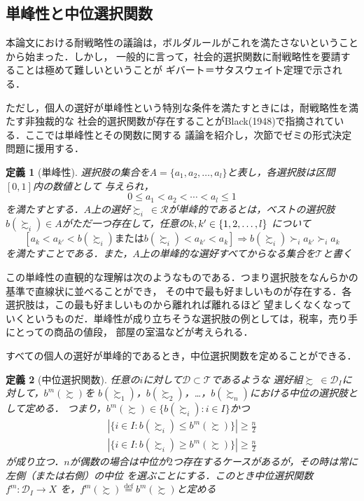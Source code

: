 \documentclass[dvipdfmx]{jsarticle}
\newtheorem*{DEfinition}{定義}
\begin{document}
\subsection{単峰性と中位選択関数}
本論文における耐戦略性の議論は，ボルダルールがこれを満たさないということから始まった．しかし，
一般的に言って，社会的選択関数に耐戦略性を要請することは極めて難しいということが
ギバート＝サタスウェイト定理で示される．

ただし，個人の選好が単峰性という特別な条件を満たすときには，耐戦略性を満たす非独裁的な
社会的選択関数が存在することがBlack(1948)で指摘されている．ここでは単峰性とその関数に関する
議論を紹介し，次節でゼミの形式決定問題に援用する．

\begin{DEfinition}[単峰性]
  選択肢の集合を$A = \{a_1, a_2, \ldots, a_{l}\}$と表し，各選択肢は区間$[0,1]$内の数値として
  与えられ，
  \[
    0 \leq a_1 < a_2 < \cdots < a_{l} \leq 1
  \]
  を満たすとする．$A$上の選好$\succsim_i \ \in \mathcal{R}$が単峰的であるとは，ベストの選択肢
  $b(\succsim_i) \in A$がただ一つ存在して，任意の$k, k' \in \{ 1, 2, \ldots, \mathnormal{l} \}$
  について
  \[
    [a_k < a_{k'} < b(\succsim_i) \text{または} b(\succsim_i) < a_{k'} < a_k]
    \Rightarrow b(\succsim_i) \succ_i a_{k'} \succ_i a_{k}
  \]
  を満たすことである．また，$A$上の単峰的な選好すべてからなる集合を$\mathcal{T}$と書く
\end{DEfinition}

この単峰性の直観的な理解は次のようなものである．つまり選択肢をなんらかの基準で直線状に並べることができ，
その中で最も好ましいものが存在する．各選択肢は，この最も好ましいものから離れれば離れるほど
望ましくなくなっていくというものだ．単峰性が成り立ちそうな選択肢の例としては，税率，売り手にとっての商品の値段，
部屋の室温などが考えられる．

すべての個人の選好が単峰的であるとき，中位選択関数を定めることができる．

\begin{DEfinition}[中位選択関数]
  任意の$i$に対して$\mathcal{D} \subset \mathcal{T}$であるような
  選好組$\succsim \ \in \mathcal{D}_I$に対して，$b^m(\succsim)$を
  $b(\succsim_1)$，$b(\succsim_2)$，\ldots，$b(\succsim_n)$における中位の選択肢として定める．
  つまり，$b^m(\succsim) \in \{ b(\succsim_i):i \in I \}$かつ
  \begin{eqnarray*}
    | \{i \in I: b(\succsim_i) \leq b^m(\succsim) \} | \geq \frac{n}{2} \\
    | \{i \in I: b(\succsim_i) \geq b^m(\succsim) \} | \geq \frac{n}{2}
  \end{eqnarray*}
  が成り立つ．$n$が偶数の場合は中位が$2$つ存在するケースがあるが，その時は常に左側（または右側）の中位
  を選ぶことにする．このとき中位選択関数$f^m\colon \mathcal{D}_{I} \to X$
  を，$f^m(\succsim) \stackrel{\mathrm{def}}{=} b^m(\succsim)$と定める
\end{DEfinition}
\end{document}
